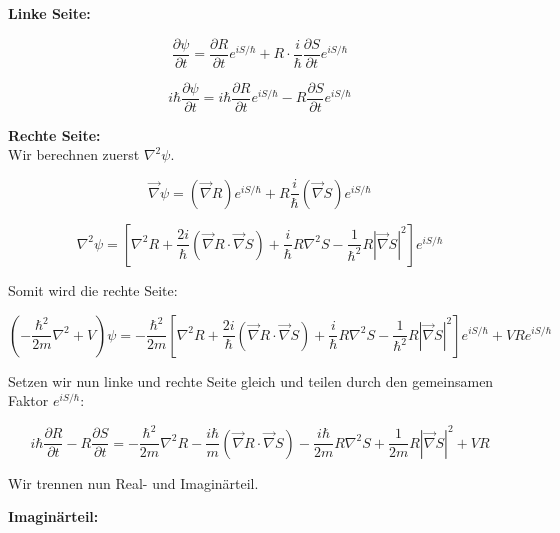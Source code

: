 \textbf{Linke Seite:}

\begin{equation}
    \frac{\partial \psi}{\partial t} = \frac{\partial R}{\partial t} e^{iS/\hbar} + R \cdot \frac{i}{\hbar} \frac{\partial S}{\partial t} e^{iS/\hbar}
\end{equation}

\begin{equation}
    i\hbar \frac{\partial \psi}{\partial t} = i\hbar \frac{\partial R}{\partial t} e^{iS/\hbar} - R \frac{\partial S}{\partial t} e^{iS/\hbar}
\end{equation}

\textbf{Rechte Seite:}\\
Wir berechnen zuerst $\nabla^2 \psi$.

\begin{equation}
    \vec{\nabla} \psi = (\vec{\nabla} R) e^{iS/\hbar} + R \frac{i}{\hbar} (\vec{\nabla} S) e^{iS/\hbar}
\end{equation}

\begin{equation}
    \nabla^2 \psi = \left[ \nabla^2 R + \frac{2i}{\hbar} (\vec{\nabla} R \cdot \vec{\nabla} S) + \frac{i}{\hbar} R \nabla^2 S - \frac{1}{\hbar^2} R \left| \vec{\nabla} S \right|^2 \right] e^{iS/\hbar}
\end{equation}

Somit wird die rechte Seite:

\begin{equation}
    \left( -\frac{\hbar^2}{2m} \nabla^2 + V \right) \psi = -\frac{\hbar^2}{2m} \left[ \nabla^2 R + \frac{2i}{\hbar} (\vec{\nabla} R \cdot \vec{\nabla} S) + \frac{i}{\hbar} R \nabla^2 S - \frac{1}{\hbar^2} R \left| \vec{\nabla} S \right|^2 \right] e^{iS/\hbar} + V R e^{iS/\hbar}
\end{equation}

Setzen wir nun linke und rechte Seite gleich und teilen durch den gemeinsamen Faktor $e^{iS/\hbar}$:

\begin{equation}
    i\hbar \frac{\partial R}{\partial t} - R \frac{\partial S}{\partial t} = -\frac{\hbar^2}{2m} \nabla^2 R - \frac{i\hbar}{m} (\vec{\nabla} R \cdot \vec{\nabla} S) - \frac{i\hbar}{2m} R \nabla^2 S + \frac{1}{2m} R \left| \vec{\nabla} S \right|^2 + V R
\end{equation}

Wir trennen nun Real- und Imaginärteil.

\textbf{Imaginärteil:}

